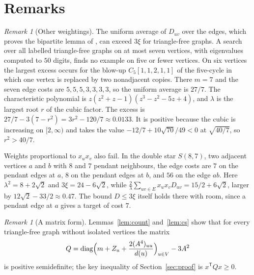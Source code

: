 \documentclass[11pt]{article}
\theoremstyle{remark}
\newtheorem{remark}[theorem]{Remark}
\newcommand{\Dcost}{D}
\DeclareMathOperator{\diag}{diag}
\begin{document}
\section{Remarks}

\begin{remark}[Other weightings]\label{rem:weights}
The uniform average of $\Dcost_{uv}$ over the edges, which proves the bipartite lemma of
\cite{LLN}, can exceed $3\xi$ for triangle-free graphs. A search over all labelled triangle-free
graphs on at most seven vertices, with eigenvalues computed to $50$ digits, finds no example on
five or fewer vertices. On six vertices the largest excess occurs for the blow-up
$C_5[1,1,2,1,1]$ of the five-cycle in which one vertex is replaced by two nonadjacent copies.
There $m=7$ and the seven edge costs are $5,5,5,3,3,3,3$, so the uniform average is $27/7$. The
characteristic polynomial is $z(z^2+z-1)(z^3-z^2-5z+4)$, and $\lambda$ is the largest root $r$ of
the cubic factor. The excess is $27/7-3(7-r^2)=3r^2-120/7\approx0.0133$. It is positive because
the cubic is increasing on $[2,\infty)$ and takes the value $-12/7+10\sqrt{70}/49<0$ at
$\sqrt{40/7}$, so $r^2>40/7$.

Weights proportional to $x_ux_v$ also fail. In the double star $S(8,7)$, two adjacent vertices
$a$ and $b$ with $8$ and $7$ pendant neighbours, the edge costs are $7$ on the pendant edges at
$a$, $8$ on the pendant edges at $b$, and $56$ on the edge $ab$. Here $\lambda^2=8+2\sqrt2$ and
$3\xi=24-6\sqrt2$, while $\tfrac{2}{\lambda}\sum_{uv\in E}x_ux_v\Dcost_{uv}=15/2+6\sqrt2$, larger by
$12\sqrt2-33/2\approx0.47$. The bound $D\le3\xi$ itself holds there with room, since a pendant edge
at $a$ gives a target of cost $7$.
\end{remark}

\begin{remark}[A matrix form]
Lemmas~\ref{lem:count} and~\ref{lem:cs} show that for every triangle-free graph without isolated
vertices the matrix
\[
  Q=\diag\Bigl(m+Z_u+\frac{2(A^4)_{uu}}{d(u)}\Bigr)_{u\in V}-3A^2
\]
is positive semidefinite; the key inequality of Section~\ref{sec:proof} is $x^{\mathsf T}Qx\ge0$.
\end{remark}
\end{document}
